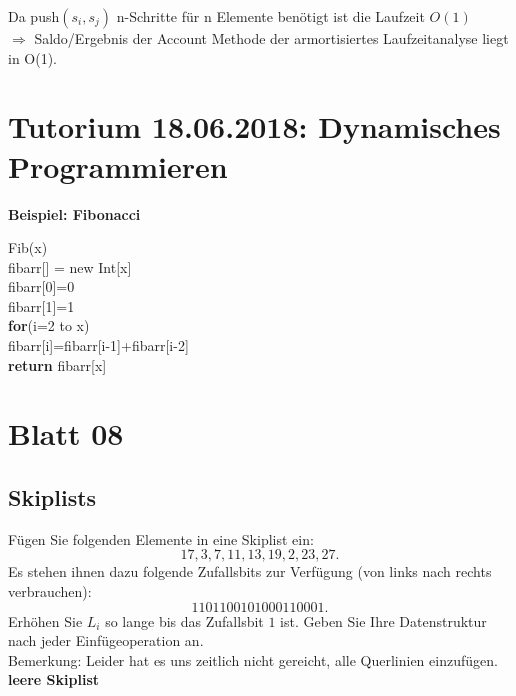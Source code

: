 \documentclass[paper=a4, fontsize=11pt]{scrartcl}
\numberwithin{equation}{section}
\numberwithin{figure}{section}
\numberwithin{table}{section}
\begin{document}
Da push$(s_{i},s_{j})$ n-Schritte für n Elemente benötigt ist die Laufzeit $O(1)$ \\
$\Rightarrow$ Saldo/Ergebnis der Account Methode der armortisiertes Laufzeitanalyse liegt in O(1).

\newpage
\section{Tutorium 18.06.2018: Dynamisches Programmieren}

\textbf{Beispiel: Fibonacci}

\begin{algorithm}[H]
\SetAlgoLined
Fib(x) \\
fibarr[] = new Int[x] \\
fibarr[0]=0 \\
fibarr[1]=1 \\
\textbf{for}(i=2 to x) \\
      fibarr[i]=fibarr[i-1]+fibarr[i-2] \\
\textbf{return} fibarr[x]      
\end{algorithm}

\newpage
\section{Blatt 08}
\subsection{Skiplists}
Fügen Sie folgenden Elemente in eine Skiplist ein:
\[ 17,3,7,11,13,19,2,23,27. \]
Es stehen ihnen dazu folgende Zufallsbits zur Verfügung (von links nach rechts verbrauchen):
\[ 1101100101000110001. \]
Erhöhen Sie $L_i$ so lange bis das Zufallsbit $1$ ist. Geben Sie Ihre Datenstruktur nach jeder Ein\-füge\-operation an. \\

Bemerkung: Leider hat es uns zeitlich nicht gereicht, alle Querlinien einzufügen.  \\

\textbf{leere Skiplist} \\

 \\
\end{document}

